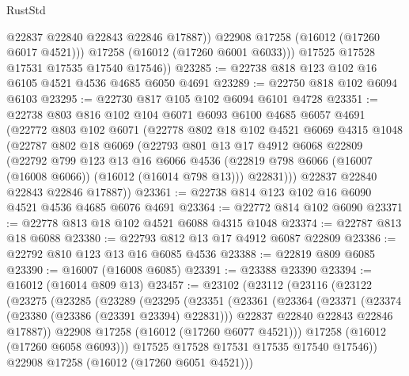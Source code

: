 \begin{lexlean}{RustStd}
\begin{coremodule}
                @22837
                @22840
                @22843
                @22846
                @17887))
            @22908
            @17258
            (@16012 (@17260 @6017 @4521)))
          @17258
          (@16012 (@17260 @6001 @6033)))
        @17525
        @17528
        @17531
        @17535
        @17540
        @17546))
@23285 := @22738 @818 @123 @102 @16 @6105 @4521 @4536 @4685 @6050 @4691
@23289 := @22750 @818 @102 @6094 @6103
@23295 := @22730 @817 @105 @102 @6094 @6101 @4728
@23351 := @22738
    @803
    @816
    @102
    @104
    @6071
    @6093
    @6100
    @4685
    @6057
    @4691
    (@22772
      @803
      @102
      @6071
      (@22778
        @802
        @18
        @102
        @4521
        @6069
        @4315
        @1048
        (@22787
          @802
          @18
          @6069
          (@22793
            @801
            @13
            @17
            @4912
            @6068
            @22809
            (@22792
              @799
              @123
              @13
              @16
              @6066
              @4536
              (@22819 @798 @6066 (@16007 (@16008 @6066)) (@16012 (@16014 @798 @13)))
              @22831)))
        @22837
        @22840
        @22843
        @22846
        @17887))
@23361 := @22738 @814 @123 @102 @16 @6090 @4521 @4536 @4685 @6076 @4691
@23364 := @22772 @814 @102 @6090
@23371 := @22778 @813 @18 @102 @4521 @6088 @4315 @1048
@23374 := @22787 @813 @18 @6088
@23380 := @22793 @812 @13 @17 @4912 @6087 @22809
@23386 := @22792 @810 @123 @13 @16 @6085 @4536
@23388 := @22819 @809 @6085
@23390 := @16007 (@16008 @6085)
@23391 := @23388 @23390
@23394 := @16012 (@16014 @809 @13)
@23457 := @23102
    (@23112
      (@23116
        (@23122
          (@23275
            (@23285
              (@23289
                (@23295
                  (@23351
                    (@23361
                      (@23364
                        (@23371
                          (@23374 (@23380 (@23386 (@23391 @23394) @22831)))
                          @22837
                          @22840
                          @22843
                          @22846
                          @17887))
                      @22908
                      @17258
                      (@16012 (@17260 @6077 @4521)))
                    @17258
                    (@16012 (@17260 @6058 @6093)))
                  @17525
                  @17528
                  @17531
                  @17535
                  @17540
                  @17546))
              @22908
              @17258
              (@16012 (@17260 @6051 @4521)))

\end{coremodule}
\end{lexlean}
